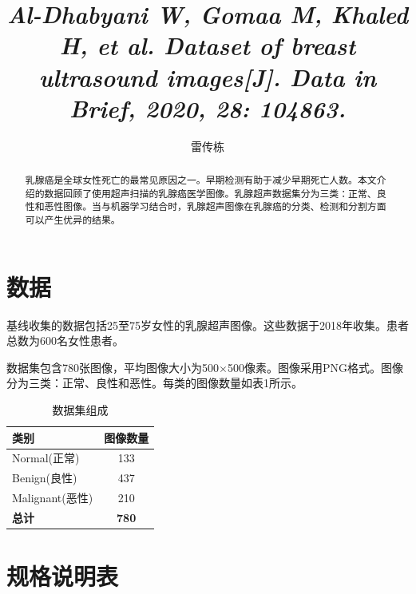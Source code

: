 \documentclass[supercite]{../Hust-undergraduate-translation/Experimental_Report}
\title{\textit{Al-Dhabyani W, Gomaa M, Khaled H, et al. Dataset of breast ultrasound images[J]. Data in Brief, 2020, 28: 104863.}}
\author{雷传栋} %
\theoremstyle{definition}
\begin{document}
\maketitle
\clearpage



\begin{abstract}
乳腺癌是全球女性死亡的最常见原因之一。早期检测有助于减少早期死亡人数。本文介绍的数据回顾了使用超声扫描的乳腺癌医学图像。乳腺超声数据集分为三类：正常、良性和恶性图像。当与机器学习结合时，乳腺超声图像在乳腺癌的分类、检测和分割方面可以产生优异的结果。
\end{abstract}

\section{数据}

基线收集的数据包括25至75岁女性的乳腺超声图像。这些数据于2018年收集。患者总数为600名女性患者。

数据集包含780张图像，平均图像大小为500$\times$500像素。图像采用PNG格式。图像分为三类：正常、良性和恶性。每类的图像数量如表1所示。

\begin{table}[htbp]
\centering
\caption{数据集组成}
\label{tbl:dataset_composition}
\begin{tabular}{|l|c|}
\hline
类别 & 图像数量 \\
\hline
Normal(正常) & 133 \\
\hline
Benign(良性) & 437 \\
\hline
Malignant(恶性) & 210 \\
\hline
\textbf{总计} & \textbf{780} \\
\hline
\end{tabular}
\end{table}

\section{规格说明表}
\end{document}
